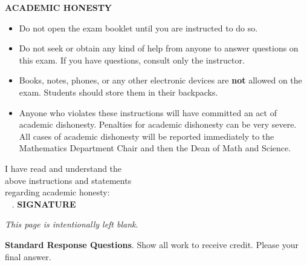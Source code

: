\documentclass[addpoints,12pt,answers]{exam}
\begin{document}
\textbf{ACADEMIC HONESTY}\\
\phantom{.}\hspace{.7cm}
\begin{minipage}{6.3in}
	\begin{itemize}
		
		\item Do not open the exam booklet until you are instructed to do so.
		\item Do not seek or obtain any kind of help from anyone to answer questions on this exam. If you have questions, consult only the instructor.
		\item Books, notes, phones, or any other electronic devices are \textbf{not} allowed on the exam. Students should store them in their backpacks.
		\item Anyone who violates these instructions will have committed an act of academic dishonesty.
		Penalties for academic dishonesty can be very severe. All cases of academic dishonesty will be reported immediately to the Mathematics Department Chair and then the Dean of Math and Science.
	\end{itemize}
\end{minipage}

\vspace{1cm}

\noindent I have read and understand the\\ above instructions and statements\\ regarding academic honesty:  \, \, \hrulefill\\
\ {\color{white} .} \hspace{11 cm} \textbf{{\footnotesize SIGNATURE}}


\vfill

\newpage
\phantom{.}
\vfill
\begin{center}
   \textit{This page is intentionally left blank}.
\end{center}
\vfill

\newpage


\begin{tcolorbox}[colback=gray!15,colframe=black]
		{\textbf{Standard Response Questions}. Show all work to receive credit. Please  your final answer. }
\end{tcolorbox}
\end{document}
